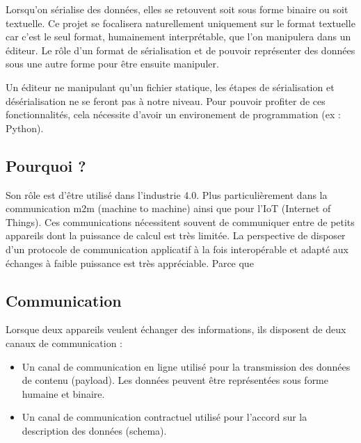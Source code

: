 \documentclass[
    iict, %
    il, %
]{heig-tb}
\begin{document}
Lorsqu'on sérialise des données, elles se retouvent soit sous forme binaire ou soit textuelle.
Ce projet se focalisera naturellement uniquement sur le format textuelle car c'est le seul format, humainement interprétable, que l'on manipulera dans un éditeur.
Le rôle d'un format de sérialisation et de pouvoir représenter des données sous une autre forme pour être ensuite manipuler.

Un éditeur ne manipulant qu'un fichier statique, les étapes de sérialisation et désérialisation ne se feront pas à notre niveau.
Pour pouvoir profiter de ces fonctionnalités, cela nécessite d'avoir un environement de programmation (ex : Python).



\subsection{Pourquoi ?}
Son rôle est d'être utilisé dans l'industrie 4.0. Plus particulièrement dans la communication m2m (machine to machine) ainsi que pour l'IoT (Internet of Things).
Ces communications nécessitent souvent de communiquer entre de petits appareils dont la puissance de calcul est très limitée.
La perspective de disposer d'un protocole de communication applicatif à la fois interopérable et adapté aux échanges à faible puissance est très appréciable.
Parce que %

\subsection{Communication}
Lorsque deux appareils veulent échanger des informations, ils disposent de deux canaux de communication :
\begin{itemize}
    \item Un canal de communication en ligne utilisé pour la transmission des données de contenu (payload). Les données peuvent être représentées sous forme humaine et binaire.
    \item Un canal de communication contractuel utilisé pour l'accord sur la description des données (schema).
\end{itemize}
\end{document}
